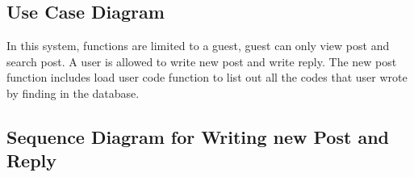 \subsection{Use Case Diagram}
\begin{figure}[H]
 \label{6}
 \end{figure}
In this system, functions are limited to a guest, guest can only view post and search post. A user is allowed to write new post and write reply. The new post function includes load user code function to list out all the codes that user wrote by finding in the database.\newline

\subsection{Sequence Diagram for Writing new Post and Reply}
\begin{figure}[H]
 \label{7}
 \end{figure}

